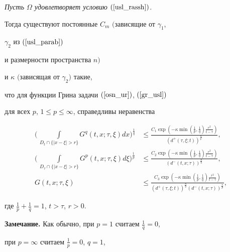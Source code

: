 {\it Пусть $\Omega$ удовлетворяет условию $(\ref{usl_rassh})$.


Тогда существуют постоянные $C_m$ $($за\-ви\-ся\-щие от $\gamma_1$,


$\gamma_2$ из $(\ref{usl_parab})$


и размерности пространства $n)$


и $\kappa$ $($зависящая от $\gamma_2)$ такие,


что для функции Грина задачи $(\ref{osn_ur})$, $(\ref{gr_usl})$


для всех $p$, $1\leq p\leq \infty$, справедливы неравенства


\begin{align}


\bigg(\,\int\limits_{D_t\cap\{ |x-\xi|>r \} }\!\! G^q(t,x;\tau,\xi)dx


\bigg)^{\frac{1}{q}}&\leq


\frac{C_1\exp(-\kappa \min(\frac{1}{p},\frac{1}{q})


\frac{r^2}{t-\tau} )}{(d^{+}


(\tau,\xi;t))^{\frac{n}{p}}},\label{noifgq} \\


%


\bigg(\,\int\limits_{D_\tau\cap\{ |x-\xi|>r \} }\!\! G^p(t,x;\tau,\xi)d\xi


\bigg)^{\frac{1}{p}}&\leq


\frac{C_2\exp(-\kappa \min(\frac{1}{p},\frac{1}{q})


\frac{r^2}{t-\tau} )}{(d^{-}


(t,x;\tau))^{\frac{n}{q}}},\label{noifgp} \\


%


G(t,x;\tau,\xi) &\leq


\frac{C_3 \exp(-\kappa \min(\frac{1}{p},\frac{1}{q})


\frac{r^2}{t-\tau} )}{(d^{+}


(\tau,\xi;t))^{\frac{n}{q}}(d^{-}(t,x;\tau))^{\frac{n}{p}}},\label{nofg}


\end{align}


где $\frac{1}{p}+\frac{1}{q}=1$, $t>\tau$, $r>0$.}


\medskip





{\bf Замечание.} Как обычно, при $p=1$ считаем $\frac{1}{q}=0$,


при $p=\infty$ считаем $\frac{1}{p}=0$, $q=1$, 


